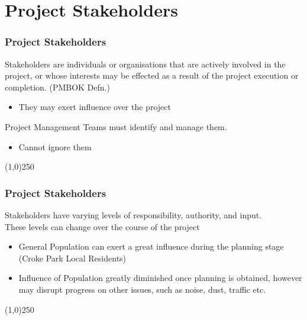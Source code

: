 \section{Project Stakeholders}


\begin{frame}
\frametitle{Project Stakeholders}
Stakeholders are individuals or organisations that are actively involved in the project, or whose interests may be effected as a result of the project execution or completion. (PMBOK Defn.)\\
\begin{itemize}
	\item They may exert influence over the project
\end{itemize}
Project Management Teams must identify and manage them.
\begin{itemize}
	\item Cannot ignore them 
\end{itemize}
\end{frame}
\begin{center}\line(1,0){250}\end{center}



\begin{frame}
\frametitle{Project Stakeholders}
Stakeholders have varying levels of responsibility, authority, and input.\\
These levels can change over the course of the project\\
\begin{itemize}
	\item General Population can exert a great influence during the planning stage (Croke Park Local Residents)
	\item Influence of Population greatly diminished once planning is obtained, however may disrupt progress on other issues, such as noise, dust, traffic etc.
\end{itemize}
\end{frame}
\begin{center}\line(1,0){250}\end{center}



